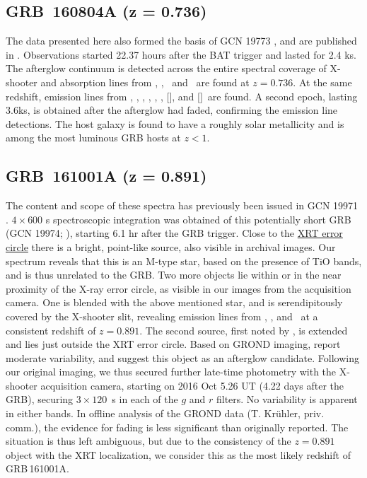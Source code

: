 \documentclass[longauth]{aa}    %
\begin{document}
\subsection{GRB~160804A (z = 0.736)}\label{160804}

The data presented here also formed the basis of GCN 19773 \citep{GCN19773}, and
are published in \citet{Heintz2017b}. Observations started 22.37 hours after the
BAT trigger and lasted for 2.4 ks. The afterglow continuum is detected across the
entire spectral coverage of X-shooter and absorption lines from \mgi, \mgii,
\feii~and \alii~are found at $z = 0.736$. At the same redshift, emission lines
from \oii, \oiii, \ha, \hb, \hg, \niil, [\sii], and [\siii]~are found. A second epoch,
lasting 3.6ks, is obtained after the afterglow had faded, confirming the
emission line detections. The host galaxy is found to have a roughly solar
metallicity and is among the most luminous GRB hosts at $z < 1$.


\subsection{GRB~161001A (z = 0.891)}	\label{161001}

The content and scope of these spectra has previously been issued in GCN 19971
\citep{GCN19971}. $4 \times 600$ s spectroscopic integration was obtained of
this potentially short GRB (GCN 19974; \citealt{GCN19974}), starting 6.1 hr
after the GRB trigger. Close to the
\href{http://www.swift.ac.uk/xrt_positions/00020702/}{XRT error circle}
\citep{GCN19969} there is a bright, point-like source, also visible in archival
images. Our spectrum reveals that this is an M-type star, based on the presence
of TiO bands, and is thus unrelated to the GRB. Two more objects lie within or
in the near proximity of the X-ray error circle, as visible in our images from
the acquisition camera. One is blended with the above mentioned star, and is
serendipitously covered by the X-shooter slit, revealing emission lines from
\oii, \hb, and \ha~at a consistent redshift of $z = 0.891$. The second source,
first noted by \citet{GCN19975}, is extended and lies just outside the XRT error
circle. Based on GROND imaging, \citet{GCN19975} report moderate variability,
and suggest this object as an afterglow candidate. Following our original
imaging, we thus secured further late-time photometry with the X-shooter
acquisition camera, starting on 2016 Oct 5.26 UT (4.22 days after the GRB),
securing $3 \times 120$~s in each of the $g$ and $r$ filters. No variability is
apparent in either bands. In offline analysis of the GROND data (T. Kr\"uhler,
priv. comm.), the evidence for fading is less significant than originally
reported. The situation is thus left ambiguous, but due to the consistency of
the $z = 0.891$ object with the XRT localization, we consider this as the most
likely redshift of GRB\,161001A.
\end{document}

